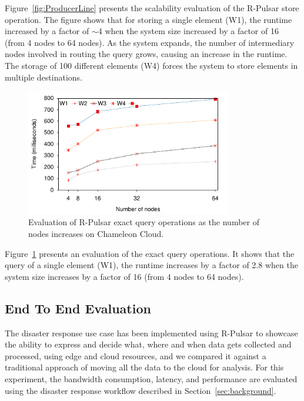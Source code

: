 Figure~\ref{fig:ProducerLine} presents the scalability evaluation of the R-Pulsar store operation. The figure shows that for storing a single element (W1), the runtime increased by a factor of $\sim$4 when the system size increased by a factor of 16 (from 4 nodes to 64 nodes). As the system expands, the number of intermediary nodes involved in routing the query grows, causing an increase in the runtime. The storage of 100 different elements (W4) forces the system to store elements in multiple destinations. %

\begin{figure}[h!]
  \includegraphics[width=0.8\textwidth]{Results/ProducerLineEx.pdf}
  \caption{Evaluation of R-Pulsar exact query operations as the number of nodes increases on Chameleon Cloud.}
  \label{fig:ProducerLineEx}
\end{figure}

Figure~\ref{fig:ProducerLineEx} presents an evaluation of the exact query operations. It shows that the query of a single element (W1), the runtime increases by a factor of 2.8 when the system size increases by a factor of 16 (from 4 nodes to 64 nodes).

\subsection{End To End Evaluation}

The disaster response use case has been implemented using R-Pulsar to showcase the ability to express and decide what, where and when data gets collected and processed, using edge and cloud resources, and we compared it against a traditional approach of moving all the data to the cloud for analysis.
For this experiment, the bandwidth consumption, latency, and performance are evaluated using the disaster response workflow described in Section~\ref{sec:background}.


